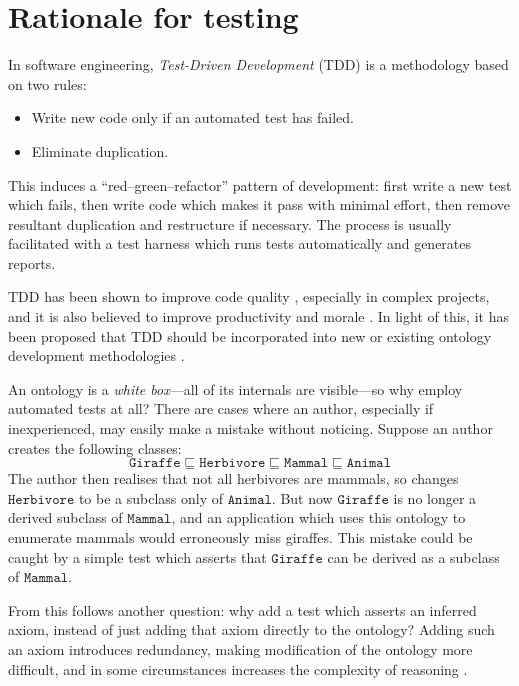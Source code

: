 \documentclass[draft]{sig-alternate}
\begin{document}
\section{Rationale for testing}
\label{sec:rationale}

In software engineering, \emph{Test-Driven Development} (TDD) \cite{Beck:TDD} is a methodology based on two rules:
\begin{itemize}[nosep]
  \item Write new code only if an automated test has failed.
  \item Eliminate duplication.
\end{itemize}
This induces a ``red--green--refactor'' pattern of development: first write a new test which fails, then write code which makes it pass with minimal effort, then remove resultant duplication and restructure if necessary.  The process is usually facilitated with a test harness which runs tests automatically and generates reports.

TDD has been shown to improve code quality \cite{Rafique:TDD}, especially in complex projects, and it is also believed to improve productivity and morale \todo[cite].  In light of this, it has been proposed that TDD should be incorporated into new or existing ontology development methodologies \cite{Keet:TDDOntologies}.

An ontology is a \emph{white box}---all of its internals are visible---so why employ automated tests at all?  There are cases where an author, especially if inexperienced, may easily make a mistake without noticing.  Suppose an author creates the following classes:
\[ \mathtt{Giraffe} \sqsubseteq \mathtt{Herbivore} \sqsubseteq \mathtt{Mammal} \sqsubseteq \mathtt{Animal} \]
The author then realises that not all herbivores are mammals, so changes $\mathtt{Herbivore}$ to be a subclass only of $\mathtt{Animal}$.  But now $\mathtt{Giraffe}$ is no longer a derived subclass of $\mathtt{Mammal}$, and an application which uses this ontology to enumerate mammals would erroneously miss giraffes.  This mistake could be caught by a simple test which asserts that $\mathtt{Giraffe}$ can be derived as a subclass of $\mathtt{Mammal}$.

From this follows another question: why add a test which asserts an inferred axiom, instead of just adding that axiom directly to the ontology?  Adding such an axiom introduces redundancy, making modification of the ontology more difficult, and in some circumstances increases the complexity of reasoning \cite{Vrandecic:UnitTestsOntologies}.
\end{document}
